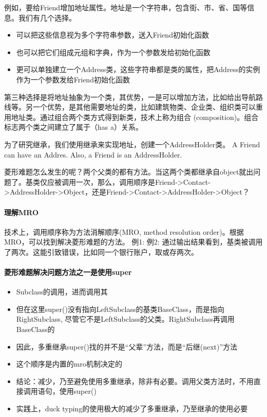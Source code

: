 例如，要给Friend增加地址属性。地址是一个字符串，包含街、市、省、国等信息。我们有几个选择。
\begin{itemize}
\item 可以把这些信息视为多个字符串参数，送入Friend初始化函数
\item 也可以把它们组成元组和字典，作为一个参数发给初始化函数
\item 更可以单独建立一个Address类，这些字符串都是类的属性，把Address的实例作为一个参数发给Friend初始化函数
\end{itemize}
第三种选择是将地址抽象为一个类，其优势，一是可以增加方法，比如给出导航路线等。另一个优势，是其他需要地址的类，比如建筑物类、企业类、组织类可以重用地址类。通过组合两个类方式得到新类，技术上称为组合 (composition)。组合标志两个类之间建立了属于（has a）关系。

为了研究继承，我们使用继承来实现地址，创建一个AddressHolder类。
A Friend can have an Addres. Also, a Friend is an AddressHolder.

菱形难题怎么发生的呢？两个父类的都有方法。当这两个类都继承自object就出问题了。基类仅应被调用一次，那么，调用顺序是Friend->Contact->AddressHolder->Object，还是Friend->Contact->AddressHolder->Object？
\paragraph{理解MRO}
技术上，调用顺序称为方法消解顺序(MRO, method resolution order)。根据MRO，可以找到解决菱形难题的方法。
例1:
例2:
通过输出结果看到，基类被调用了两次。这能引致错误，比如同一个银行账户，取或存两次。
\paragraph{菱形难题解决问题方法之一是使用super}
\begin{itemize}
\item Subclass的调用，进而调用其
\item 但在这里super()没有指向LeftSubclass的基类BaseClass，而是指向RightSubclass, 尽管它不是LeftSubclass的父类。RightSubclass再调用BaseClass的
\item 因此，多重继承super()找的并不是“父辈”方法，而是“后继(next)”方法
\item 这个顺序是内置的mro机制决定的
\item 结论：减少，乃至避免使用多重继承，除非有必要。调用父类方法时，不用直接调用语句，使用super()
\item 实践上，duck typing的使用极大的减少了多重继承，乃至继承的使用必要
\end{itemize}
